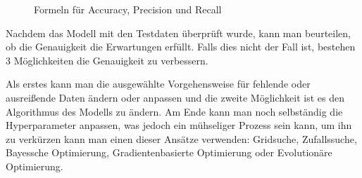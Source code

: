 \begin{enumerate}
\begin{figure}[H]
                  \caption{Formeln für Accuracy, Precision und Recall}
            \end{figure}

            Nachdem das Modell mit den Testdaten überprüft wurde, kann man beurteilen, ob die Genauigkeit die Erwartungen erfüllt. Falls dies nicht der Fall ist, bestehen 3 Möglichkeiten die Genauigkeit zu verbessern.

            Als erstes kann man die ausgewählte Vorgehensweise für fehlende oder ausreißende Daten ändern oder anpassen und die zweite Möglichkeit ist es den Algorithmus des Modells zu ändern. Am Ende kann man noch selbständig die Hyperparameter anpassen, was jedoch ein mühseliger Prozess sein kann, um ihn zu verkürzen kann man einen dieser Ansätze verwenden: Gridsuche, Zufallssuche, Bayessche Optimierung, Gradientenbasierte Optimierung oder Evolutionäre Optimierung. \cite{MLkg}
\end{enumerate}